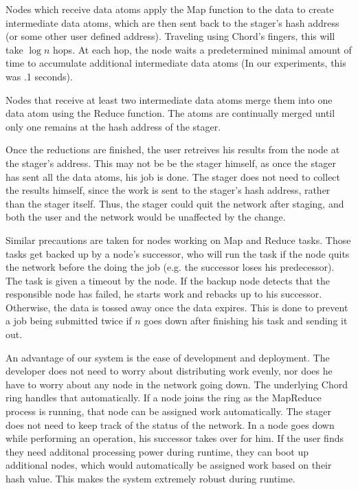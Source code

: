 \documentclass[10pt, conference, compsocconf]{IEEEtran}
\begin{document}
Nodes which receive data atoms apply the Map function to the data to create intermediate data atoms, which are then sent back to the stager's hash address (or some other user defined address).  Traveling using Chord's fingers, this will take $\log n$ hops.  At each hop, the node waits a predetermined minimal amount of time to accumulate additional intermediate data atoms (In our experiments, this was .1 seconds).%

Nodes that receive at least two intermediate data atoms merge them into one data atom using the Reduce function.   The atoms are continually merged until only one remains at the hash address of the stager. 

Once the reductions are finished, the user retreives his results from the node at the stager's address.  This may not be be the stager himself, as once the stager has sent all the data atoms, his job is done.  The stager does not need to collect the results himself, since the work is sent to the stager's hash address, rather than the stager itself.  Thus, the stager could quit the network after staging, and both the user and the network would be unaffected by the change. %

Similar precautions are taken for nodes working on Map and Reduce tasks.  Those tasks get backed up by a node's successor, who will run the task if the node quits the network before the doing the job (e.g. the successor loses his predecessor).   The task is given a timeout by the node.  If the backup node detects that the responsible node has failed, he starts work and rebacks up to his successor.  Otherwise, the data is tossed away once the data expires. This is done to prevent a job being submitted twice if $n$ goes down after finishing his task and sending it out.

An advantage of our system is the ease of development and deployment.  The developer does not need to worry about distributing work evenly, nor does he have to worry about any node in the network going down.  The underlying Chord ring handles that automatically.  If a node joins the ring as the MapReduce process is running, that node can be assigned work automatically.  The stager does not need to keep track of the status of the network.  In a node goes down while performing an operation, his successor takes over for him.  If the user finds they need additonal processing power during runtime, they can boot up additional nodes, which would automatically be assigned work based on their hash value.  This makes the system extremely robust during runtime.
\end{document}

